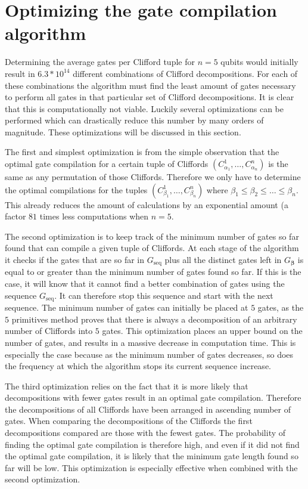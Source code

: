   \section{Optimizing the gate compilation algorithm}
    \label{Optimizing the gate compilation algorithm}
    Determining the average gates per Clifford tuple for $n=5$ qubits would initially result in $6.3*10^{14}$ different combinations of Clifford decompositions. For each of these combinations the algorithm must find the least amount of gates necessary to perform all gates in that particular set of Clifford decompositions. It is clear that this is computationally not viable. Luckily several optimizations can be performed which can drastically reduce this number by many orders of magnitude. These optimizations will be discussed in this section.

    The first and simplest optimization is from the simple observation that the optimal gate compilation for a certain tuple of Cliffords $\left(C_{\alpha_1}^1, \dots, C_{\alpha_n}^n\right)$ is the same as any permutation of those Cliffords. Therefore we only have to determine the optimal compilations for the tuples $\left(C_{\beta_1}^1, \dots, C_{\beta_n}^n\right)$ where $\beta_1 \leq \beta_2 \leq \dots \leq \beta_n$. This already reduces the amount of calculations by an exponential amount (a factor $81$ times less computations when $n=5$.

    The second optimization is to keep track of the minimum number of gates so far found that can compile a given tuple of Cliffords. At each stage of the algorithm it checks if the gates that are so far in $G_\text{seq}$ plus all the distinct gates left in $G_{\bm{\beta}}$ is equal to or greater than the minimum number of gates found so far. If this is the case, it will know that it cannot find a better combination of gates using the sequence $G_\text{seq}$. It can therefore stop this sequence and start with the next sequence. The minimum number of gates can initially be placed at $5$ gates, as the $5$ primitives method proves that there is always a decomposition of an arbitrary number of Cliffords into $5$ gates. This optimization places an upper bound on the number of gates, and results in a massive decrease in computation time. This is especially the case because as the minimum number of gates decreases, so does the frequency at which the algorithm stops its current sequence increase.

    The third optimization relies on the fact that it is more likely that decompositions with fewer gates result in an optimal gate compilation. Therefore the decompositions of all Cliffords have been arranged in ascending number of gates. When comparing the decompositions of the Cliffords the first decompositions compared are those with the fewest gates. The probability of finding the optimal gate compilation is therefore high, and even if it did not find the optimal gate compilation, it is likely that the minimum gate length found so far will be low. This optimization is especially effective when combined with the second optimization.

